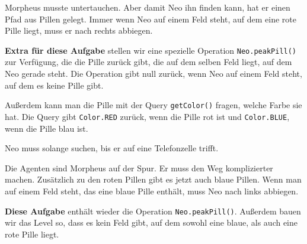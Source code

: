             \subexcercise Morpheus musste untertauchen. Aber damit Neo ihn finden kann, hat er einen Pfad aus Pillen gelegt. Immer wenn Neo auf einem Feld steht, auf dem eine rote Pille liegt, muss er nach rechts abbiegen.

            \textbf{Extra für diese Aufgabe} stellen wir eine spezielle Operation \texttt{Neo.peakPill()} zur Verfügung, die die Pille zurück gibt, die auf dem selben Feld liegt, auf dem Neo gerade steht. Die Operation gibt null zurück, wenn Neo auf einem Feld steht, auf dem es keine Pille gibt.

            Außerdem kann man die Pille mit der Query \texttt{getColor()} fragen, welche Farbe sie hat.
            Die Query gibt \texttt{Color.RED} zurück, wenn die Pille rot ist und \texttt{Color.BLUE}, wenn die Pille blau ist.

            Neo muss solange suchen, bis er auf eine Telefonzelle trifft.

            \subexcercise Die Agenten sind Morpheus auf der Spur. Er muss den Weg komplizierter machen. Zusätzlich zu den roten Pillen gibt es jetzt auch blaue Pillen. Wenn man auf einem Feld steht, das eine blaue Pille enthält, muss Neo nach links abbiegen.

            \textbf{Diese Aufgabe} enthält wieder die Operation \texttt{Neo.peakPill()}. Außerdem bauen wir das Level so, dass es kein Feld gibt, auf dem sowohl eine blaue, als auch eine rote Pille liegt.
